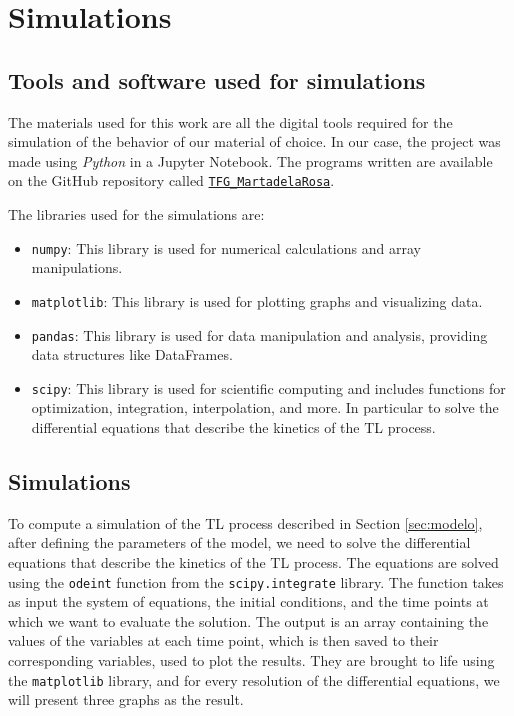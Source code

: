 \chapter{Simulations} \label{ch:4}

\section{Tools and software used for simulations} \label{sec:materials}

The materials used for this work are all the digital tools required for the simulation of the behavior of our material of choice. In our case, the project was made using \textit{Python} in a Jupyter Notebook. The programs written are available on the GitHub repository called \href{https://github.com/MartadelaRosa/TFG_MartadelaRosa}{\texttt{TFG\_MartadelaRosa}}. 

\vspace{10pt}

The libraries used for the simulations are:
\begin{itemize}
    \item \texttt{numpy}: This library is used for numerical calculations and array manipulations.
    \item \texttt{matplotlib}: This library is used for plotting graphs and visualizing data.
    \item \texttt{pandas}: This library is used for data manipulation and analysis, providing data structures like DataFrames.
    \item \texttt{scipy}: This library is used for scientific computing and includes functions for optimization, integration, interpolation, and more. In particular to solve the differential equations that describe the kinetics of the TL process.
\end{itemize}



\section{Simulations} \label{sec:simulations}

To compute a simulation of the TL process described in Section \ref{sec:modelo}, after defining the parameters of the model, we need to solve the differential equations that describe the kinetics of the TL process. The equations are solved using the \texttt{odeint} function from the \texttt{scipy.integrate} library. The function takes as input the system of equations, the initial conditions, and the time points at which we want to evaluate the solution. The output is an array containing the values of the variables at each time point, which is then saved to their corresponding variables, used to plot the results. They are brought to life using the \texttt{matplotlib} library, and for every resolution of the differential equations, we will present three graphs as the result.

